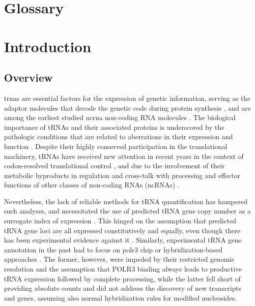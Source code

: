 \documentclass[12pt]{rockefeller}
\begin{document}
\chapter*{Glossary}
\printglossary[type=\acronymtype,nonumberlist,title={List of Abbreviations}]
\printglossary[nonumberlist,title={Glossary}]
\mainmatter
\pagestyle{fancy}
\fancyhf{}
\lhead{\chaptername\ \thechapter}
\rhead{\thesection}
\rfoot{\thepage}

\chapter{Introduction}
\section{Overview}
\glspl{trna} are essential factors for the expression of genetic information, serving as the adaptor molecules that decode the genetic code during protein synthesis \cite{Crick:1955}, and are among the earliest studied \gls{ncrna} non-coding RNA molecules \cite{Woese:1967, Soll:1995}. The biological importance of tRNAs and their associated proteins is underscored by the pathologic conditions that are related to aberrations in their expression and function \cite{Cooper:2009da, Park:2008gg, Griffiths:2011ge, McFarland:2004fz}.
Despite their highly conserved participation in the translational machinery, tRNAs have received new attention in recent years in the context of codon-resolved translational control \cite{Dana:2012kq,Dana:2014bs,Mahlab:2012dg,Plotkin:2010fu,Tuller:2010ge,Weinberg:2016kh}, and due to the involvement of their metabolic byproducts in regulation and cross-talk with processing and effector functions of other classes of non-coding RNAs (ncRNAs) \cite{Hasler:2016ce,Ivanov:2011iu,Lee:2009fb,Haussecker:2010hda, Babiarz:2008bs}.

Nevertheless, the lack of reliable methods for tRNA quantification has hampered such analyses, and necessitated the use of predicted tRNA gene copy number as a surrogate index of expression \cite{Iben:2014dt,Pechmann:2012ey,Tuller:2010ge}. This hinged on the assumption that predicted tRNA gene loci are all expressed constitutively and equally, even though there has been experimental evidence against it \cite{Gingold:2014iz}. Similarly, experimental tRNA gene annotation in the past had to focus on \gls{polr3} \gls{chip} \cite{Moqtaderi:2010hc, Oler:2010fb, Kutter:2011ff} or hybridization-based approaches \cite{Dittmar:2004fb, Goodarzi:2016gd}. The former, however, were impeded by their restricted genomic resolution and the assumption that POLR3 binding always leads to productive tRNA expression followed by complete processing, while the latter fell short of providing absolute counts and did not address the discovery of new transcripts and genes, assuming also normal hybridization rules for modified nucleosides.
\end{document}

